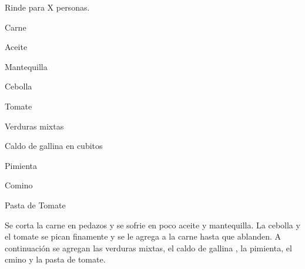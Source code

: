 
Rinde para X personas.


\begin{ingredientes}
\item Carne
\item Aceite
\item Mantequilla
\item Cebolla
\item Tomate
\item Verduras mixtas
\item Caldo de gallina en cubitos
\item Pimienta
\item Comino
\item Pasta de Tomate
\end{ingredientes}
\preparacion
Se corta la carne en pedazos y se sofrie en poco aceite y mantequilla. La cebolla y el tomate se pican finamente y se le agrega a la carne  hasta que ablanden. A continuación se agregan las verduras mixtas, el  caldo de gallina , la pimienta, el cmino y la pasta de tomate.

